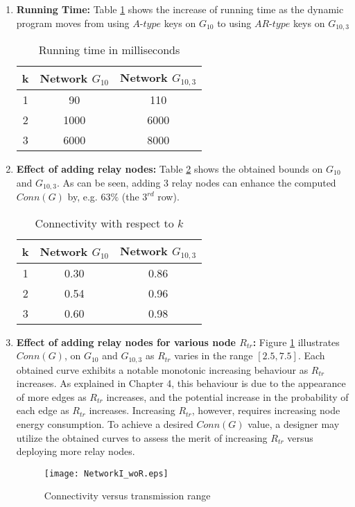 \begin{enumerate}
\item \textbf{Running Time:} Table \ref{Tab:rtym1} shows the increase of running time as the dynamic program moves from using $A\mbox{-}type$ keys on $G_{10}$ to using $AR\mbox{-}type$ keys on $G_{10,3}$ 
\begin{table}[!htb]
    \begin{minipage}{1\linewidth}
   
      \centering
     \begin{tabular}{|c|c|c|}
     \hline
         k& Network $G_{10}$ &Network $G_{10,3}$\\
     \hline
     1&90& 110 \\\hline
     2&1000 &6000	\\\hline
3 &6000&8000	 \\\hline
\end{tabular}
 \caption{Running time in milliseconds}
\label{Tab:rtym1}
    \end{minipage}
\end{table}
\item \textbf{Effect of adding relay nodes:} Table \ref{Tab:SRC} shows the obtained bounds on $G_{10}$ and $G_{10,3}$. As can be seen, adding 3 relay nodes can enhance the computed $Conn(G)$ by, e.g. $63\%$ (the $3^{rd}$ row).


\begin{table}[!htb]
  \centering
 \begin{minipage}{.5\linewidth}
     \begin{tabular}{|c|c|c|}
     \hline
     k & Network $G_{10}$ & Network $G_{10,3}$  \\
     \hline
      1 & 0.30 & 0.86 \\\hline
	  2 & 0.54 & 0.96\\\hline
	  3 &0.60 & 0.98 \\\hline
\end{tabular}
    \end{minipage}
     \caption{Connectivity with respect to $k$}
      \label{Tab:SRC}   
\end{table}
\item \textbf{Effect of adding relay nodes for various node $R_{tr}$:}
Figure \ref{Fig:NWOR} illustrates $Conn(G)$, on  $G_{10}$ and $G_{10,3}$ as $R_{tr}$ varies in the range $[2.5,7.5]$. Each obtained curve exhibits a notable monotonic increasing behaviour as $R_{tr}$ increases. As explained in Chapter 4, this behaviour is due to the appearance of more edges as $R_{tr}$ increases, and the potential increase in the probability of each edge as $R_{tr}$ increases. Increasing $R_{tr}$, however, requires increasing node energy consumption. To achieve a desired $Conn(G)$ value, a designer may utilize the obtained curves to assess the merit of increasing $R_{tr}$ versus deploying more relay nodes.
\begin{figure}[!htb]
\begin{minipage}{.9\linewidth}
\end{minipage}
\texttt{[image: NetworkI\_woR.eps]}
\caption{Connectivity versus transmission range}
\label{Fig:NWOR}
\end{figure}


\end{enumerate}
